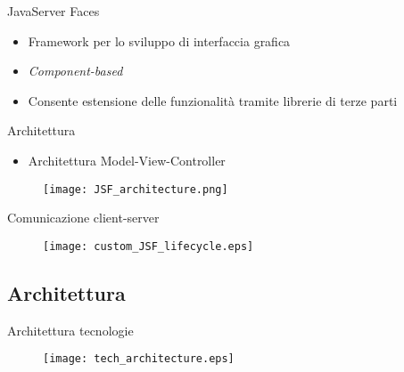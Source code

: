 \begin{frame}{JavaServer Faces}

\begin{itemize}
\item Framework per lo sviluppo di interfaccia grafica
\item \textsl{Component-based}
\item Consente estensione delle funzionalità tramite librerie di terze parti
\end{itemize}

\end{frame}


\begin{frame}{Architettura}

\begin{itemize}
\item Architettura Model-View-Controller
\end{itemize}

\begin{figure}
	\centering
	\texttt{[image: JSF\_architecture.png]}
\end{figure}

\end{frame}


\begin{frame}{Comunicazione client-server}
\begin{figure}
	\centering
	\texttt{[image: custom\_JSF\_lifecycle.eps]}
\end{figure}

\end{frame}


\subsection{Architettura}

\begin{frame}{Architettura tecnologie}
\begin{figure}
	\centering
	\texttt{[image: tech\_architecture.eps]}
\end{figure}
\end{frame}



